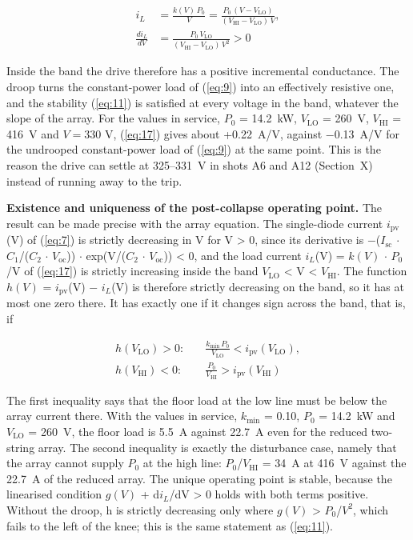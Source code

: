 \documentclass[journal]{IEEEtran}
\begin{document}
\begin{equation}
\begin{aligned} i_L &= \frac{k(V)\,P_0}{V} = \frac{P_0\,(V - V_{\mathrm{LO}})}{(V_{\mathrm{HI}} - V_{\mathrm{LO}})\,V},\\ \frac{di_L}{dV} &= \frac{P_0\,V_{\mathrm{LO}}}{(V_{\mathrm{HI}} - V_{\mathrm{LO}})\,V^{2}} > 0 \end{aligned}
\label{eq:17}
\end{equation}

Inside the band the drive therefore has a positive incremental conductance. The droop turns the constant-power load of (\ref{eq:9}) into an effectively resistive one, and the stability (\ref{eq:11}) is satisfied at every voltage in the band, whatever the slope of the array. For the values in service, $P_0$ = 14.2~kW, $V_{\mathrm{LO}}$ = 260~V, $V_{\mathrm{HI}}$ = 416~V and $V = 330$ V, (\ref{eq:17}) gives about +0.22~A/V, against $-$0.13~A/V for the undrooped constant-power load of (\ref{eq:9}) at the same point. This is the reason the drive can settle at 325--331~V in shots A6 and A12 (Section~X) instead of running away to the trip.

\textbf{Existence and uniqueness of the post-collapse operating point.} The result can be made precise with the array equation. The single-diode current $i_{\mathrm{pv}}$(V) of (\ref{eq:7}) is strictly decreasing in V for V > 0, since its derivative is $-$($I_{\mathrm{sc}}$ $\cdot$ $C_1$/($C_2$ $\cdot$ $V_{\mathrm{oc}}$)) $\cdot$ exp(V/($C_2$ $\cdot$ $V_{\mathrm{oc}}$)) < 0, and the load current $i_L$(V) = $k(V)$ $\cdot$ $P_0$/V of (\ref{eq:17}) is strictly increasing inside the band $V_{\mathrm{LO}}$ < V < $V_{\mathrm{HI}}$. The function $h(V)$ = $i_{\mathrm{pv}}$(V) $-$ $i_L$(V) is therefore strictly decreasing on the band, so it has at most one zero there. It has exactly one if it changes sign across the band, that is, if

\begin{equation}
\begin{aligned} h(V_{\mathrm{LO}}) > 0:&\quad \frac{k_{\min}\,P_0}{V_{\mathrm{LO}}} < i_{\mathrm{pv}}(V_{\mathrm{LO}}),\\ h(V_{\mathrm{HI}}) < 0:&\quad \frac{P_0}{V_{\mathrm{HI}}} > i_{\mathrm{pv}}(V_{\mathrm{HI}}) \end{aligned}
\label{eq:18}
\end{equation}

The first inequality says that the floor load at the low line must be below the array current there. With the values in service, $k_{\min}$ = 0.10, $P_0$ = 14.2~kW and $V_{\mathrm{LO}}$ = 260~V, the floor load is 5.5~A against 22.7~A even for the reduced two-string array. The second inequality is exactly the disturbance case, namely that the array cannot supply $P_0$ at the high line: $P_0$/$V_{\mathrm{HI}}$ = 34~A at 416~V against the 22.7~A of the reduced array. The unique operating point is stable, because the linearised condition $g(V)$ + d$i_L$/dV > 0 holds with both terms positive. Without the droop, h is strictly decreasing only where $g(V)$ > $P_0$/$V^{2}$, which fails to the left of the knee; this is the same statement as (\ref{eq:11}).
\end{document}
